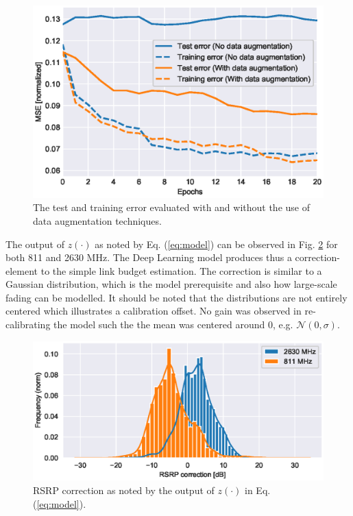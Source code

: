 \begin{figure}
    \centering
    \includegraphics{chapters/part_pathloss/model_aided_paper/dataaugmentation_training_test_error.eps}
    \caption{The test and training error evaluated with and without the use of data augmentation techniques.}
    \label{fig:dataaugmentation_training_test_error}
\end{figure}

The output of $z(\cdot)$ as noted by Eq. (\ref{eq:model}) can be observed in Fig. \ref{fig:rsrp_correction_hist} for both 811 and 2630 MHz. The Deep Learning model produces thus a correction-element to the simple link budget estimation. The correction is similar to a Gaussian distribution, which is the model prerequisite and also how large-scale fading can be modelled. It should be noted that the distributions are not entirely centered which illustrates a calibration offset. No gain was observed in re-calibrating the model such the the mean was centered around $0$, e.g. $\mathcal{N}(0, \sigma)$.

\begin{figure}
    \centering
    \includegraphics{chapters/part_pathloss/model_aided_paper/rsrp_correction_hist.eps}
    \caption{RSRP correction as noted by the output of $z(\cdot)$ in Eq. (\ref{eq:model}).}
    \label{fig:rsrp_correction_hist}
\end{figure}

